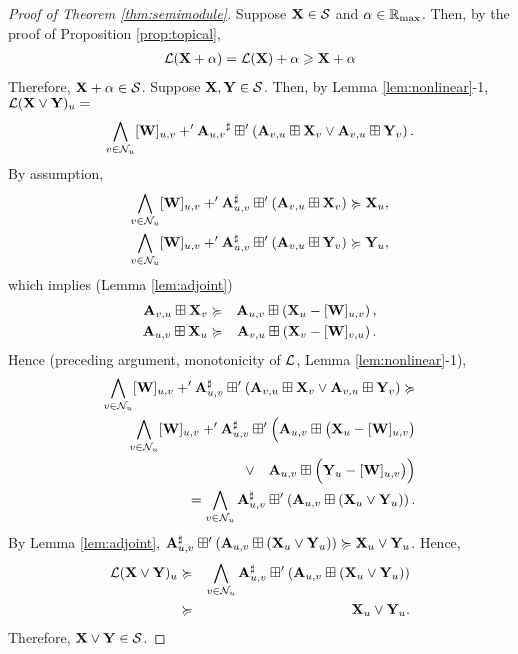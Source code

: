 \documentclass[letterpaper, 10 pt, conference]{ieeeconf}
\begin{document}
\begin{proof}[Proof of Theorem \ref{thm:semimodule}]
    Suppose $\mathbf{X} \in \mathcal{S}$ and $\alpha \in \mathbb{R}_{\mathrm{max}}$. Then, by the proof of Proposition \ref{prop:topical},
    \begin{align*}
        \mathcal{L}(\mathbf{X} + \alpha) = \mathcal{L}(\mathbf{X}) + \alpha \geqslant \mathbf{X} + \alpha
    \end{align*}
    Therefore, $\mathbf{X} + \alpha \in \mathcal{S}$. Suppose $\mathbf{X}, \mathbf{Y} \in \mathcal{S}$. Then, by Lemma \ref{lem:nonlinear}-1, $\mathcal{L}(\mathbf{X} \vee \mathbf{Y})_u=$
    \begin{align*}
        \bigwedge_{v \in \mathcal{N}_u} [\mathbf{W}]_{u,v} +' {\mathbf{A}_{u,v}}^{\sharp} \boxplus' \left( \mathbf{A}_{v,u} \boxplus \mathbf{X}_v \vee \mathbf{A}_{v,u} \boxplus \mathbf{Y}_v \right). 
    \end{align*}
    By assumption,
    \begin{align*}
        \bigwedge_{v \in \mathcal{N}_u} [\mathbf{W}]_{u,v} +' {\mathbf{A}}^{\sharp}_{u,v} \boxplus' \left( \mathbf{A}_{v,u} \boxplus \mathbf{X}_v \right) \succcurlyeq \mathbf{X}_u, \\
          \bigwedge_{v \in \mathcal{N}_u} [\mathbf{W}]_{u,v} +' {\mathbf{A}}^{\sharp}_{u,v} \boxplus' \left( \mathbf{A}_{v,u} \boxplus \mathbf{Y}_v \right) \succcurlyeq \mathbf{Y}_u,
    \end{align*}
    which implies (Lemma \ref{lem:adjoint})
    \begin{align*}
        \mathbf{A}_{v,u} \boxplus \mathbf{X}_v  &\succcurlyeq& \mathbf{A}_{u,v} \boxplus \left( \mathbf{X}_u - [\mathbf{W}]_{u,v} \right), \\
        \mathbf{A}_{u,v} \boxplus \mathbf{X}_u  &\succcurlyeq& \mathbf{A}_{v,u} \boxplus \left( \mathbf{X}_v - [\mathbf{W}]_{v,u} \right). 
   \end{align*}
   Hence (preceding argument, monotonicity of $\mathcal{L}$, Lemma \ref{lem:nonlinear}-1),
   \footnotesize
   \begin{align*}
       \bigwedge_{v \in \mathcal{N}_u} [\mathbf{W}]_{u,v} +' {\mathbf{A}}^{\sharp}_{u,v} \boxplus' \left( \mathbf{A}_{v,u} \boxplus \mathbf{X}_v \vee \mathbf{A}_{v,u} \boxplus \mathbf{Y}_v \right) \succcurlyeq   \\
       \bigwedge_{v \in \mathcal{N}_u}  [\mathbf{W}]_{u,v} +' {\mathbf{A}}^{\sharp}_{u,v} \boxplus' \Bigl( \mathbf{A}_{u,v} \boxplus \bigl( \mathbf{X}_u - [\mathbf{W}]_{u,v} \bigr) \Bigr. \\ 
       \Bigl. \quad \vee \quad \mathbf{A}_{u,v} \boxplus \Bigl( \mathbf{Y}_u - [\mathbf{W}]_{u,v} \bigr) \Bigr)  \\
       = \bigwedge_{v \in \mathcal{N}_u} {\mathbf{A}}^{\sharp}_{u,v} \boxplus' \left( \mathbf{A}_{u,v} \boxplus \left( \mathbf{X}_u \vee \mathbf{Y}_u \right) \right).
   \end{align*}
   \normalsize
   By Lemma \ref{lem:adjoint}, ${\mathbf{A}}^{\sharp}_{u,v} \boxplus' \left( \mathbf{A}_{u,v} \boxplus \left( \mathbf{X}_u \vee \mathbf{Y}_u \right) \right) \succcurlyeq \mathbf{X}_u \vee \mathbf{Y}_u$. Hence,
\begin{align*}
        \mathcal{L}(\mathbf{X} \vee \mathbf{Y})_u  &\succcurlyeq& \bigwedge_{v \in \mathcal{N}_u} {\mathbf{A}}^{\sharp}_{u,v} \boxplus' \left( \mathbf{A}_{u,v} \boxplus \left( \mathbf{X}_u \vee \mathbf{Y}_u \right) \right) \\
        &\succcurlyeq& \mathbf{X}_u \vee \mathbf{Y}_u.
\end{align*}
Therefore, $\mathbf{X} \vee \mathbf{Y} \in \mathcal{S}$.
\end{proof}
\end{document}

